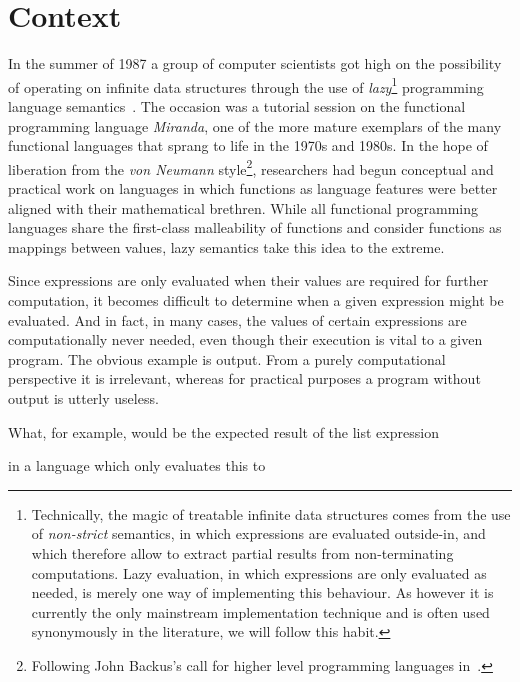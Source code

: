 \chapter{Context}

In the summer of 1987 a group of computer scientists got high on the
possibility of operating on infinite data structures through the use of
\emph{lazy}\footnote{Technically, the magic of treatable infinite data
structures comes from the use of \emph{non-strict} semantics, in which
expressions are evaluated outside-in, and which therefore allow to extract
partial results from non-terminating computations. Lazy evaluation, in which
expressions are only evaluated as needed, is merely one way of implementing
this behaviour. As however it is currently the only mainstream implementation
technique and is often used synonymously in the literature, we will follow this
habit.} programming language semantics~\cite[p. 12-3]{hask-history}. The
occasion was a tutorial session on the functional programming language
\emph{Miranda}, one of the more mature exemplars of the many functional
languages that sprang to life in the 1970s and 1980s. In the hope of liberation
from the \emph{von Neumann} style\footnote{Following John Backus's call for
higher level programming languages in~\cite{backus}.}, researchers had begun
conceptual and practical work on languages in which functions as language
features were better aligned with their mathematical brethren. While all
functional programming languages share the first-class malleability of
functions and consider functions as mappings between values, lazy semantics
take this idea to the extreme.

Since expressions are only evaluated when their values are required for
further computation, it becomes difficult to determine when a given
expression might be evaluated. And in fact, in many cases, the values of
certain expressions are computationally never needed, even though their
execution is vital to a given program. The obvious example is output.
From a purely computational perspective it is irrelevant, whereas for
practical purposes a program without output is utterly useless.

What, for example, would be the expected result of the list expression

\begin{code}
\end{code}

in a language which only evaluates this to

